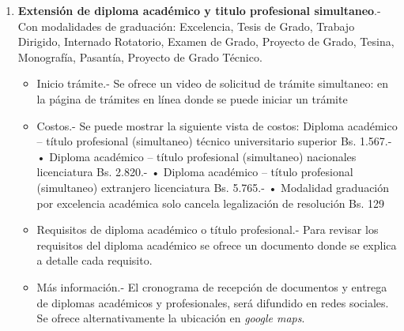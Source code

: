 \documentclass[letter, openright, 12pt]{book}
\begin{document}
\begin{enumerate}[label=(\alph*)]
\item \textbf{Extensión de diploma académico y titulo profesional simultaneo}.- Con modalidades de graduación: Excelencia, Tesis de Grado, Trabajo Dirigido, Internado Rotatorio, Examen de Grado, Proyecto de Grado, Tesina, Monografía, Pasantía, Proyecto de Grado Técnico.
\begin{itemize}
\item Inicio trámite.- Se ofrece un video de solicitud de trámite simultaneo: en la página de trámites en línea donde se puede iniciar un trámite
\item Costos.- Se puede mostrar la siguiente vista de costos: Diploma académico – título profesional (simultaneo) técnico universitario superior Bs. 1.567.- • Diploma académico – título profesional (simultaneo) nacionales licenciatura Bs. 2.820.- • Diploma académico – título profesional (simultaneo) extranjero licenciatura Bs. 5.765.- • Modalidad graduación por excelencia académica solo cancela legalización de resolución Bs. 129
\item Requisitos de diploma académico o título profesional.- Para revisar los requisitos del diploma académico se ofrece un documento donde se explica a detalle cada requisito.
\item Más información.- El cronograma de recepción de documentos y entrega de diplomas académicos y profesionales, será difundido en redes sociales. Se ofrece alternativamente la ubicación en \textit{google maps}.
\end{itemize}


\end{enumerate}
\end{document}
